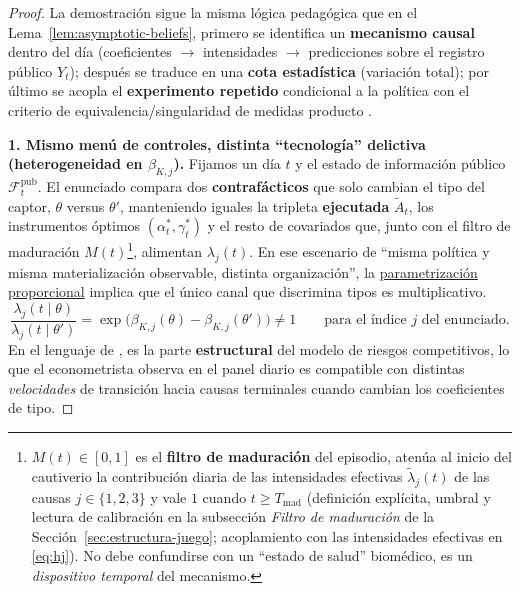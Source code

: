 \documentclass[12pt]{article}
\providecommand{\textcite}{\citet}
\theoremstyle{definition}
\theoremstyle{remark}
\newcommand{\1}{\mathbf{1}}
\begin{document}
\begin{proof}
La demostración sigue la misma lógica pedagógica que en el Lema~\ref{lem:asymptotic-beliefs}, primero se identifica un \textbf{mecanismo causal} dentro del día \textup{(}coeficientes $\to$ intensidades $\to$ predicciones sobre el registro público $Y_t$\textup{)}; después se traduce en una \textbf{cota estadística} \textup{(}variación total\textup{)}; por último se acopla el \textbf{experimento repetido} condicional a la política con el criterio de equivalencia/singularidad de medidas producto \textcite{Kakutani1948,Shiryaev2019Probability}.

\smallskip
\noindent\textbf{1. Mismo menú de controles, distinta ``tecnología'' delictiva \textup{(}heterogeneidad en $\beta_{K,j}$\textup{)}.}
Fijamos un día $t$ y el estado de información público $\mathcal{F}_t^{\mathrm{pub}}$. El enunciado compara dos \textbf{contrafácticos} que solo cambian el tipo del captor, $\theta$ versus $\theta'$, manteniendo iguales la tripleta \textbf{ejecutada} $\tilde{A}_t$, los instrumentos óptimos $(\alpha_t^\ast,\gamma_t^\ast)$ y el resto de covariados que, junto con el filtro de maduración $M(t)$\footnote{$M(t)\in[0,1]$ es el \textbf{filtro de maduración} del episodio, atenúa al inicio del cautiverio la contribución diaria de las intensidades efectivas $\tilde{\lambda}_j(t)$ de las causas $j\in\{1,2,3\}$ y vale $1$ cuando $t\ge T_{\mathrm{mad}}$ \textup{(}definición explícita, umbral y lectura de calibración en la subsección \emph{Filtro de maduración} de la Sección~\ref{sec:estructura-juego}; acoplamiento con las intensidades efectivas en \eqref{eq:hj}\textup{)}. No debe confundirse con un ``estado de salud'' biomédico, es un \emph{dispositivo temporal} del mecanismo.}, alimentan $\lambda_j(t)$. En ese escenario de ``misma política y misma materialización observable, distinta organización'', la \hyperref[subsec:intensidades-prop]{parametrización proporcional} implica que el único canal que discrimina tipos es multiplicativo.
\[
\frac{\lambda_j(t\mid\theta)}{\lambda_j(t\mid\theta')}
=\exp\bigl(\beta_{K,j}(\theta)-\beta_{K,j}(\theta')\bigr)\neq 1
\qquad\text{para el índice $j$ del enunciado.}
\]
En el lenguaje de \textcite{Cox1972,Bradburn2003}, es la parte \textbf{estructural} del modelo de riesgos competitivos, lo que el econometrista observa en el panel diario es compatible con distintas \emph{velocidades} de transición hacia causas terminales cuando cambian los coeficientes de tipo.


\end{proof}
\end{document}
